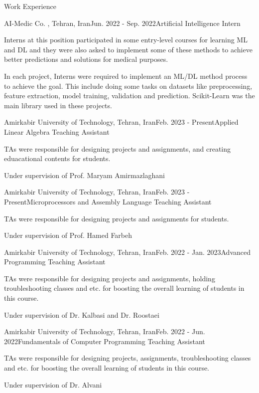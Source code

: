 \documentclass{resume}
\begin{document}
\begin{rSection}{Work Experience}
    \begin{rSubsection}{AI-Medic Co. , Tehran, Iran}{Jun. 2022 - Sep. 2022}{Artificial Intelligence Intern}{}
     \item Interns at this position participated in some entry-level courses for learning ML and DL and 
     they were also asked to implement some of these methods to achieve better predictions and solutions 
     for medical purposes.
     \item In each project, Interns were required to implement an ML/DL method process to achieve the goal. This 
     include doing some tasks on datasets like preprocessing, feature extraction, model training, validation and prediction. 
     Scikit-Learn was the main library used in these projects.  
    \end{rSubsection}

\newpage

    \begin{rSubsection}{Amirkabir University of Technology, Tehran, Iran}{Feb. 2023 - Present}{Applied Linear Algebra Teaching Assistant}{}
     \item TAs were responsible for designing projects and assignments, and creating eduacational contents for students.
     \item Under supervision of Prof. Maryam Amirmazlaghani
    \end{rSubsection}

    \begin{rSubsection}{Amirkabir University of Technology, Tehran, Iran}{Feb. 2023 - Present}{Microprocessors and Assembly Language Teaching Assistant}{}
        \item TAs were responsible for designing projects and assignments for students.
        \item Under supervision of Prof. Hamed Farbeh
       \end{rSubsection}

    \begin{rSubsection}{Amirkabir University of Technology, Tehran, Iran}{Feb. 2022 - Jan. 2023}{Advanced Programming Teaching Assistant}{}
     \item TAs were responsible for designing projects and assignments, holding troubleshooting classes and etc. for boosting the overall learning of 
     students in this course.
     \item Under supervision of Dr. Kalbasi and Dr. Roostaei 
    \end{rSubsection}

    \begin{rSubsection}{Amirkabir University of Technology, Tehran, Iran}{Feb. 2022 - Jun. 2022}{Fundamentals of Computer Programming Teaching Assistant}{}
     \item TAs were responsible for designing projects, assignments, troubleshooting classes and etc. for boosting the overall learning of 
     students in this course.
     \item Under supervision of Dr. Alvani
    \end{rSubsection}

\end{rSection}
\end{document}
